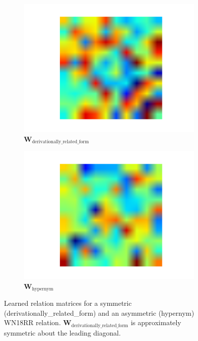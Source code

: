 \documentclass[11pt,a4paper]{article}
\begin{document}
\begin{figure}[!ht]
\centering
\begin{subfigure}[b]{0.23\textwidth}
    \centering
    \includegraphics[width=0.93\linewidth]{W_drf.pdf}
    \caption{$\mathbf{W}_{\text{derivationally\_related\_form}}$}
    \label{fig:drf}
\end{subfigure}
\begin{subfigure}[b]{0.23\textwidth}
    \centering
    \includegraphics[width=0.93\linewidth]{W_hypernym.pdf}
    \caption{$\mathbf{W}_{\text{hypernym}}$}
    \label{fig:hypernym}
\end{subfigure}
\caption{Learned relation matrices for a symmetric (derivationally\_related\_form) and an asymmetric (hypernym) WN18RR relation. $\mathbf{W}_{\text{derivationally\_related\_form}}$ is approximately symmetric about the leading diagonal.}
\label{fig:asymmetry}
\end{figure}
\end{document}
